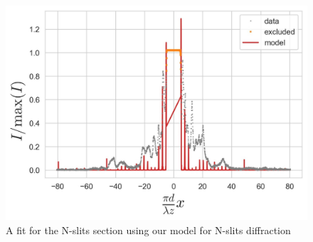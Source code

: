 \begin{figure}[H]
    \includegraphics[width=0.9\columnwidth]{figures/n slits section.jpeg}
    \caption{A fit for the N-slits section using our model for N-slits diffraction}
    \label{fig:n slits section}
\end{figure}